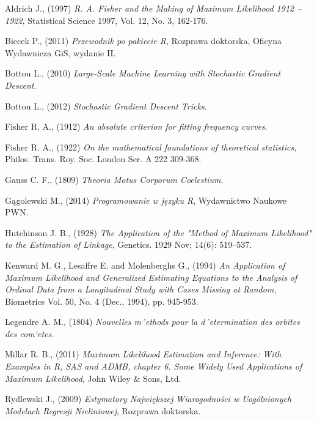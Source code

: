 \begin{thebibliography}{99}

 Aldrich J., (1997) \textit{R. A. Fisher and the Making of Maximum Likelihood 1912 – 1922}, Statistical Science
1997, Vol. 12, No. 3, 162-176.

 Biecek P., (2011) \textit{Przewodnik po pakiecie R}, Rozprawa doktorska, Oficyna Wydawnicza GiS, wydanie II.

 Bottou L., (2010) \textit{Large-Scale Machine Learning with Stochastic Gradient Descent}.

 Bottou L., (2012) \textit{Stochastic Gradient Descent Tricks}.

 Fisher R. A., (1912) \textit{An absolute criterion for fitting frequency curves}. 

 Fisher R. A., (1922) \textit{On the mathematical foundations of theoretical statistics}, Philos. Trans. Roy. Soc. London Ser. A 222 309-368.


 Gauss C. F., (1809) \textit{Theoria Motus Corporum Coelestium}.

 Gągolewski M., (2014) \textit{Programowanie w języku R}, Wydawnictwo Naukowe PWN.


 Hutchinson J. B., (1928) \textit{The Application of the "Method of Maximum Likelihood" to the Estimation of Linkage}, Genetics. 1929 Nov; 14(6): 519–537.


 Kenward M. G., Lesaffre E. and Molenberghs G., (1994) \textit{An Application of Maximum Likelihood and Generalized Estimating Equations to the Analysis of Ordinal Data from a Longitudinal Study with Cases Missing at Random}, Biometrics
Vol. 50, No. 4 (Dec., 1994), pp. 945-953.

 Legendre A. M., (1804) \textit{Nouvelles m´ethods pour la d´etermination des orbites des com`etes}.

 Millar R. B., (2011) \textit{Maximum Likelihood Estimation and Inference: With Examples in R, SAS and ADMB, chapter 6. Some Widely Used Applications of Maximum Likelihood}, John Wiley \& Sons, Ltd.

 Rydlewski J., (2009) \textit{Estymatory Największej Wiarogodności w Uogólnionych Modelach Regresji Nieliniowej}, Rozprawa doktorska.

 



\end{thebibliography}